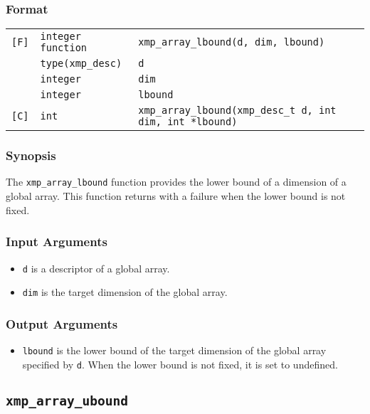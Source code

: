 \subsubsection*{Format}

\begin{tabular}{lll}

\verb![F]!& {\tt integer function}& {\tt xmp\_array\_lbound(d, dim, lbound)}\\
          & {\tt type(xmp\_desc)} & {\tt d}\\
          & {\tt integer} & {\tt dim}\\
          & {\tt integer} & {\tt lbound}\\

\verb![C]!&  {\tt int}& {\tt xmp\_array\_lbound(xmp\_desc\_t d, int dim, int *lbound)}\\

\end{tabular}

\subsubsection*{Synopsis}

The {\tt xmp\_array\_lbound} function provides the lower bound of a
dimension of a global array. This function returns with a failure when the
lower bound is not fixed.

\subsubsection*{Input Arguments}
\begin{itemize}
 \item {\tt d} is a descriptor of a global array.
 \item {\tt dim} is the target dimension of the global array.
\end{itemize}

\subsubsection*{Output Arguments}
\begin{itemize}
 \item {\tt lbound} is the lower bound of the target dimension of the
       global array specified by {\tt d}. When the lower bound is not
       fixed, it is set to undefined.
\end{itemize}


\subsection{\tt xmp\_array\_ubound}

